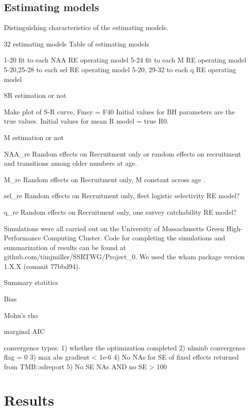\documentclass[
  12pt,
]{article}
\begin{document}
\hypertarget{estimating-models}{%
\subsection{Estimating models}\label{estimating-models}}

\begin{table}
\caption{Distinguishing characteristics of the estimating models.}
{\scriptsize }
\end{table}

32 estimating models Table of estimating models

1-20 fit to each NAA RE operating model 5-24 fit to each M RE operating
model 5-20,25-28 to each sel RE operating model 5-20, 29-32 to each q RE
operating model

SR estimation or not

Make plot of S-R curve, Fmsy = F40 Initial values for BH parameters are
the true values. Initial values for mean R model = true R0.

M estimation or not

NAA\_re Random effects on Recruitment only or random effects on
recruitment and transitions among older numbers at age.

M\_re Random effects on Recruitment only, M constant across age .

sel\_re Random effects on Recruitment only, fleet logistic selectivity
RE model?

q\_re Random effects on Recruitment only, one survey catchability RE
model?

Simulations were all carried out on the University of Massachusetts
Green High-Performance Computing Cluster. Code for completing the
simulations and summarization of results can be found at
github.com/timjmiller/SSRTWG/Project\_0. We used the wham package
version 1.X.X (commit 77bbd94).

Summary statitics

Bias

Mohn's rho

marginal AIC

convergence types: 1) whether the optimization completed 2) nlminb
convergence flag = 0 3) max abs gradient \textless{} 1e-6 4) No NAs for
SE of fixed effects returned from TMB::sdreport 5) No SE NAs AND no SE
\textgreater{} 100

\hypertarget{results}{%
\section{Results}\label{results}}
\end{document}
